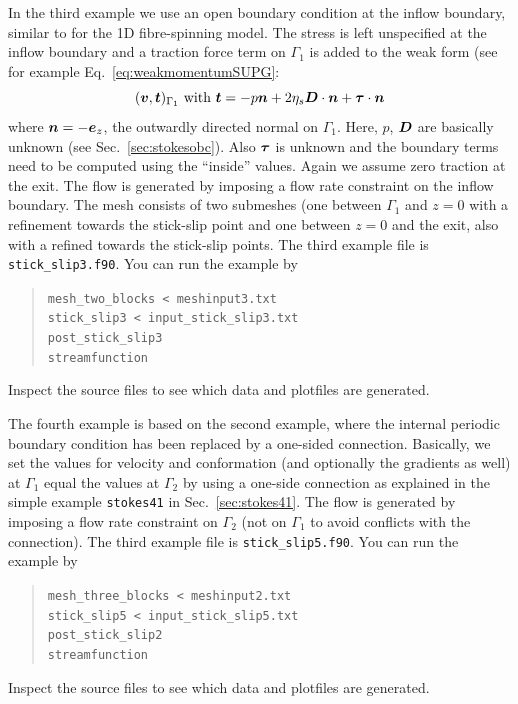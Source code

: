 In the third example we use an open boundary condition at the inflow boundary,
similar to \cite{Papanastasiou96} for the 1D fibre-spinning model. The stress
is left unspecified at the inflow boundary and a
traction force term on $\Gamma_1$ is added to the weak form (see
for example Eq.~\eqref{eq:weakmomentumSUPG}:
\begin{equation}
   (\boldsymbol{v},\boldsymbol{t})_{\Gamma_1}\text{ with }
 \boldsymbol{t}=-p\boldsymbol{n}+2\eta_s \boldsymbol{D}\cdot\boldsymbol{n}+\boldsymbol{\tau}\cdot\boldsymbol{n}
\end{equation}
where $\boldsymbol{n}=-\boldsymbol{e}_z$, the outwardly directed normal on $\Gamma_1$.
Here, $p$, $\boldsymbol{D}$ are basically unknown (see Sec.~\ref{sec:stokesobc}). 
Also $\boldsymbol{\tau}$ is unknown and the boundary terms
need to be computed using the ``inside'' values.
Again we assume zero traction at the exit.
The flow is generated by imposing a flow rate constraint on the inflow
boundary.
The mesh
consists of two submeshes (one between $\Gamma_1$ and
$z=0$ with a refinement
towards the
stick-slip point and one between $z=0$
and the exit, also with a refined towards the stick-slip points.
The third example file is \texttt{stick\_slip3.f90}.
You can run the example by
\begin{quote}
   \texttt{mesh\_two\_blocks < meshinput3.txt}\\
   \texttt{stick\_slip3 < input\_stick\_slip3.txt}\\
   \texttt{post\_stick\_slip3}\\
   \texttt{streamfunction}
\end{quote}
Inspect the source files to see which data and plotfiles are generated.

The fourth example is based on the second example, where the
internal periodic boundary condition has been replaced by a one-sided
connection.
Basically, we set the values for velocity and conformation (and optionally the
gradients as well)
at $\Gamma_1$ equal the values at $\Gamma_2$ by using a one-side connection as
explained in the simple example \texttt{stokes41} in Sec.~\ref{sec:stokes41}.
The flow is generated by imposing a flow rate constraint on $\Gamma_2$ (not on
$\Gamma_1$ to avoid conflicts with the connection).
The third example file is \texttt{stick\_slip5.f90}.
You can run the example by
\begin{quote}
   \texttt{mesh\_three\_blocks < meshinput2.txt}\\
   \texttt{stick\_slip5 < input\_stick\_slip5.txt}\\
   \texttt{post\_stick\_slip2}\\
   \texttt{streamfunction}
\end{quote}
Inspect the source files to see which data and plotfiles are generated.

